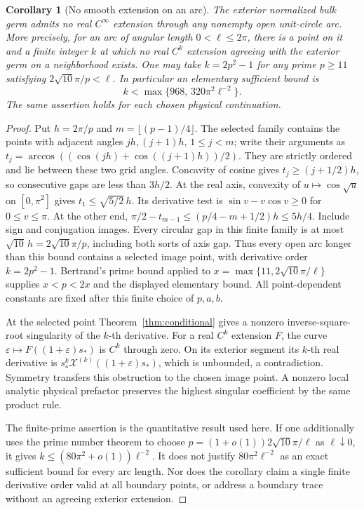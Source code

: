 \documentclass[11pt]{article}
\numberwithin{equation}{section}
\newtheorem{corollary}[theorem]{Corollary}
\theoremstyle{definition}
\newcommand{\eps}{\varepsilon}
\begin{document}
\begin{corollary}[No smooth extension on an arc]\label{cor:smootharc}
The exterior normalized bulk germ admits no real \(C^\infty\)
extension through any nonempty open unit-circle arc. More precisely,
for an arc of angular length \(0<\ell\le2\pi\), there is a point
on it and a finite integer \(k\) at which no real \(C^k\)
extension agreeing with the exterior germ on a neighborhood exists.
One may take \(k=2p^2-1\) for any prime \(p\ge11\) satisfying
\(2\sqrt{10}\pi/p<\ell\). In particular an elementary sufficient
bound is
\[
 k<\max\{968,\,320\pi^2\ell^{-2}\}.
\]
The same assertion holds for each chosen physical continuation.
\end{corollary}
\begin{proof}
Put \(h=2\pi/p\) and \(m=\lfloor(p-1)/4\rfloor\).
The selected family contains the points with adjacent angles
\(jh,(j+1)h\), \(1\le j<m\); write their arguments as
\(t_j=\arccos((\cos(jh)+\cos((j+1)h))/2)\).
They are strictly ordered and lie between these two grid angles.
Concavity of cosine gives \(t_j\ge(j+1/2)h\), so consecutive
gaps are less than \(3h/2\). At the real axis,
convexity of \(u\mapsto\cos\sqrt u\) on \([0,\pi^2]\) gives
\(t_1\le\sqrt{5/2}\,h\). Its derivative test is
\(\sin v-v\cos v\ge0\) for \(0\le v\le\pi\).
At the other end,
\(\pi/2-t_{m-1}\le(p/4-m+1/2)h\le5h/4\).
Include sign and conjugation images. Every circular gap in this
finite family is at most \(\sqrt{10}\,h=2\sqrt{10}\pi/p\),
including both sorts of axis gap. Thus every open arc longer than
this bound contains a selected image point, with derivative order
\(k=2p^2-1\). Bertrand's prime bound applied to
\(x=\max\{11,2\sqrt{10}\pi/\ell\}\) supplies \(x<p<2x\)
and the displayed elementary bound. All point-dependent constants
are fixed after this finite choice of \(p,a,b\).

At the selected point Theorem~\ref{thm:conditional} gives a nonzero
inverse-square-root singularity of the \(k\)-th derivative.
For a real \(C^k\) extension \(F\), the curve
\(\eps\mapsto F((1+\eps)s_*)\) is \(C^k\) through zero.
On its exterior segment its \(k\)-th real derivative is
\(s_*^k\mathcal X^{(k)}((1+\eps)s_*)\), which is unbounded,
a contradiction. Symmetry transfers this obstruction to the chosen
image point. A nonzero local analytic physical prefactor preserves
the highest singular coefficient by the same product rule.

The finite-prime assertion is the quantitative result used here.
If one additionally uses the prime number theorem to choose
\(p=(1+o(1))2\sqrt{10}\pi/\ell\) as \(\ell\downarrow0\),
it gives \(k\le(80\pi^2+o(1))\ell^{-2}\).
It does not justify \(80\pi^2\ell^{-2}\) as an exact sufficient
bound for every arc length. Nor does the corollary claim a single
finite derivative order valid at all boundary points, or address a
boundary trace without an agreeing exterior extension.
\end{proof}
\end{document}
